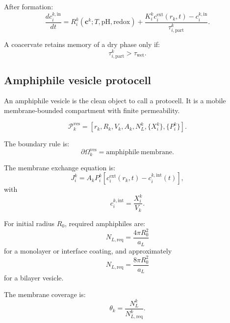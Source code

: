 \documentclass[11pt]{article}
\begin{document}
After formation:
\begin{equation}
    \frac{dc_i^{k,\mathrm{in}}}{dt}
    =
    R_i^k(\mathbf{c}^k;T,\mathrm{pH},\mathrm{redox})
    +
    \frac{
    K_i^k c_i^{\mathrm{ext}}(r_k,t)
    -
    c_i^{k,\mathrm{in}}
    }
    {\tau_{i,\mathrm{part}}^k}.
\end{equation}

A coacervate retains memory of a dry phase only if:
\begin{equation}
    \tau_{i,\mathrm{part}}^k >
    \tau_{\mathrm{wet}}.
\end{equation}

\subsection{Amphiphile vesicle protocell}

An amphiphile vesicle is the clean object to call a protocell. It is a mobile
membrane-bounded compartment with finite permeability.

\begin{equation}
    \mathcal{P}_k^{\mathrm{ves}}
    =
    \left[
    r_k,
    R_k,
    V_k,
    A_k,
    N_L^k,
    \{X_i^k\},
    \{P_i^k\}
    \right].
\end{equation}

The boundary rule is:
\begin{equation}
    \partial\Omega_k^{\mathrm{ves}}
    =
    \mathrm{amphiphile\ membrane}.
\end{equation}

The membrane exchange equation is:
\begin{equation}
    J_i^k =
    A_kP_i^k
    \left[
    c_i^{\mathrm{ext}}(r_k,t)
    -
    c_i^{k,\mathrm{int}}(t)
    \right],
\end{equation}
with
\begin{equation}
    c_i^{k,\mathrm{int}} = \frac{X_i^k}{V_k}.
\end{equation}

For initial radius $R_0$, required amphiphiles are:
\begin{equation}
    N_{L,\mathrm{req}} =
    \frac{4\pi R_0^2}{a_L}
\end{equation}
for a monolayer or interface coating, and approximately
\begin{equation}
    N_{L,\mathrm{req}} =
    \frac{8\pi R_0^2}{a_L}
\end{equation}
for a bilayer vesicle.

The membrane coverage is:
\begin{equation}
    \theta_k =
    \frac{N_L^k}{N_{L,\mathrm{req}}^k}.
\end{equation}
\end{document}
